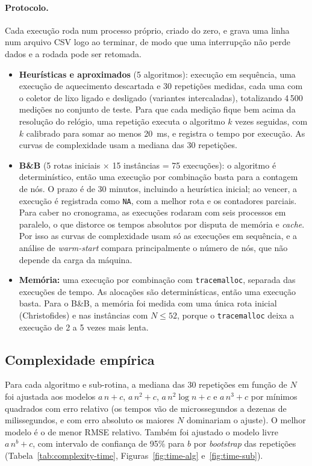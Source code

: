 \paragraph{Protocolo.} Cada execução roda num processo próprio, criado do zero, e grava
uma linha num arquivo CSV logo ao terminar, de modo que uma interrupção não perde dados
e a rodada pode ser retomada.
\begin{itemize}
  \item \textbf{Heurísticas e aproximados} (5 algoritmos): execução em sequência, uma
    execução de aquecimento descartada e 30 repetições medidas, cada uma com o coletor
    de lixo ligado e desligado (variantes intercaladas), totalizando 4\,500 medições no
    conjunto de teste. Para que cada medição fique bem acima da resolução do relógio, uma
    repetição executa o algoritmo $k$ vezes seguidas, com $k$ calibrado para somar ao
    menos 20~ms, e registra o tempo por execução. As curvas de complexidade usam a
    mediana das 30 repetições.
  \item \textbf{B\&B} (5 rotas iniciais $\times$ 15 instâncias = 75 execuções): o
    algoritmo é determinístico, então uma execução por combinação basta para a contagem de
    nós. O prazo é de 30 minutos, incluindo a heurística inicial; ao vencer, a execução é
    registrada como \texttt{NA}, com a melhor rota e os contadores parciais. Para caber no
    cronograma, as execuções rodaram com seis processos em paralelo, o que distorce os
    tempos absolutos por disputa de memória e \emph{cache}. Por isso as curvas de
    complexidade usam só as execuções em sequência, e a análise de \emph{warm-start}
    compara principalmente o número de nós, que não depende da carga da máquina.
  \item \textbf{Memória:} uma execução por combinação com \texttt{tracemalloc}, separada
    das execuções de tempo. As alocações são determinísticas, então uma execução basta.
    Para o B\&B, a memória foi medida com uma única rota inicial (Christofides) e nas
    instâncias com $N \leq 52$, porque o \texttt{tracemalloc} deixa a execução de 2 a 5
    vezes mais lenta.
\end{itemize}

\subsection{Complexidade empírica}\label{sec:complexity}

Para cada algoritmo e sub-rotina, a mediana das 30 repetições em função de $N$ foi
ajustada aos modelos $a\,n + c$, $a\,n^2 + c$, $a\,n^2\log n + c$ e $a\,n^3 + c$ por
mínimos quadrados com erro relativo (os tempos vão de microssegundos a dezenas de
milissegundos, e com erro absoluto os maiores $N$ dominariam o ajuste). O melhor modelo
é o de menor RMSE relativo. Também foi ajustado o modelo livre $a\,n^b + c$, com intervalo
de confiança de 95\% para $b$ por \emph{bootstrap} das repetições
(Tabela~\ref{tab:complexity-time}, Figuras~\ref{fig:time-alg} e~\ref{fig:time-sub}).

